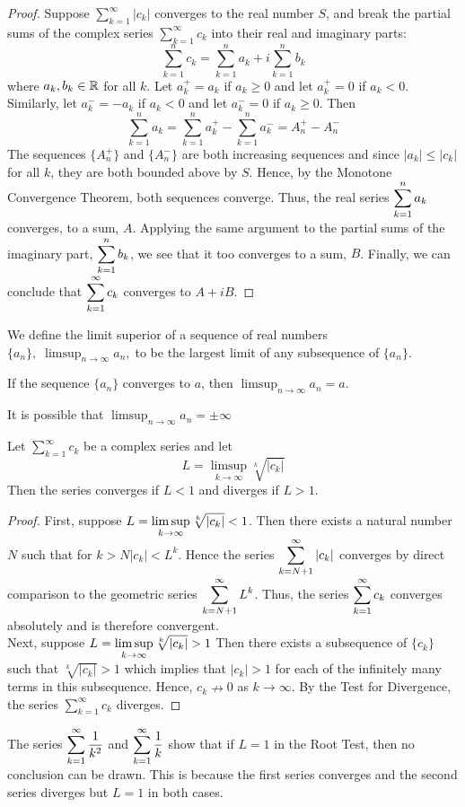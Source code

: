 \documentclass[handout]{ximera}
\begin{document}
\begin{proof}
Suppose $\displaystyle \sum_{k=1}^\infty |c_k|$ converges to the real number $S$, and break the partial sums of  the complex series 
$\displaystyle \sum_{k=1}^\infty c_k$ into their real and imaginary parts:
\[
\sum_{k=1}^n c_k =  \sum_{k=1}^n a_k + i\sum_{k=1}^n b_k
\]
where $a_k, b_k \in \mathbb R$ for all $k$.  Let $a_k^+ = a_k$ if $a_k \geq 0$ and let $a_k^+ = 0$ if $a_k < 0$.
Similarly, let $a_k^- = -a_k$ if $a_k < 0$ and let $a_k^- = 0$ if $a_k \geq 0$. Then 
\[
\sum_{k=1}^n a_k = \sum_{k=1}^n a_k^+ - \sum_{k=1}^n a_k^- = A_n^+ - A_n^-
\]
The sequences $\{A_n^+\}$ and $\{A_n^-\}$ are both increasing sequences and since $|a_k| \leq |c_k|$ for all $k$, they are both bounded above by $S$.
Hence, by the Monotone Convergence Theorem, both sequences converge.
Thus, the real series $\displaystyle \sum_{k=1}^n a_k$ converges, to a sum, $A$. Applying the same argument to the partial sums of the imaginary part, 
$\displaystyle \sum_{k=1}^n b_k$, we see that it too converges to a sum, $B$. Finally, we can conclude that $\displaystyle \sum_{k=1}^\infty c_k$ converges to $A + iB$. 
\end{proof}


\begin{definition}
We define the limit superior of a sequence of real numbers $\{a_n\}, \; \limsup_{n \to \infty} a_n,\;$to be the largest limit of any subsequence of $\{a_n\}$.\
\end{definition}


\begin{remark}
If the sequence $\{a_n\}$ converges to $a$, then $\limsup_{n \to \infty} a_n =a$.
\end{remark}

\begin{remark}
It is possible that $\limsup_{n \to \infty} a_n =\pm\infty$
\end{remark}


\begin{theorem}
Let $\displaystyle \sum_{k=1}^\infty c_k$ be a complex series and let 
\[
L = \limsup_{k \to \infty} \sqrt[k]{|c_k|}
\]
Then the series converges if $L <1$ and diverges if $L >1$.
\end{theorem}

\begin{proof}
First, suppose $\displaystyle L = \limsup_{k \to \infty} \sqrt[k]{|c_k|} < 1$. Then there exists a natural number $N$ such that for $k>N 
|c_k| < L^k$.  Hence the series $\displaystyle \sum_{k = N+1}^\infty |c_k|$ converges by direct comparison to the geometric series
$\displaystyle \sum_{k = N+1}^\infty L^k$. Thus, the series $\displaystyle\sum_{k = 1}^\infty c_k$ converges absolutely and is therefore convergent.\\
Next, suppose $\displaystyle L = \limsup_{k \to \infty} \sqrt[k]{|c_k|} > 1$ Then there exists a subsequence of $\{c_k\}$ such that $\sqrt[k]{|c_k|} > 1$
which implies that $|c_k| > 1$ for each of the infinitely many terms in this subsequence. Hence, $c_k \nrightarrow 0$ as $k \to \infty$.
By the Test for Divergence, the series $\displaystyle \sum_{k=1}^\infty c_k$ diverges.
\end{proof}

\begin{remark}
The series $\displaystyle \sum_{k=1}^\infty \frac{1}{k^2}$ and $\displaystyle \sum_{k=1}^\infty \frac{1}{k}$ show that if $L = 1$ in the Root Test,
then no conclusion can be drawn. This is because the first series converges and the second series diverges but $L=1$ in both cases.
\end{remark}
\end{document}
